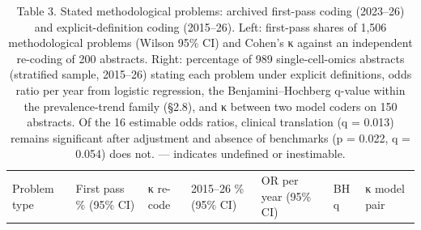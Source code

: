 \documentclass[11pt]{article}
\begin{document}
\begin{scriptsize}

\begin{longtable}[]{@{}
  >{\raggedright\arraybackslash}p{}
  >{\raggedright\arraybackslash}p{}
  >{\raggedright\arraybackslash}p{}
  >{\raggedright\arraybackslash}p{}
  >{\raggedright\arraybackslash}p{}
  >{\raggedright\arraybackslash}p{}
  >{\raggedright\arraybackslash}p{}@{}}
\caption{Table 3. Stated methodological problems: archived first-pass
coding (2023--26) and explicit-definition coding (2015--26). Left:
first-pass shares of 1,506 methodological problems (Wilson 95\% CI) and
Cohen's κ against an independent re-coding of 200 abstracts. Right:
percentage of 989 single-cell-omics abstracts (stratified sample,
2015--26) stating each problem under explicit definitions, odds ratio
per year from logistic regression, the Benjamini--Hochberg q-value
within the prevalence-trend family (§2.8), and κ between two model
coders on 150 abstracts. Of the 16 estimable odds ratios, clinical
translation (q = 0.013) remains significant after adjustment and absence
of benchmarks (p = 0.022, q = 0.054) does not. --- indicates undefined
or inestimable.}\tabularnewline
\toprule\noalign{}
\begin{minipage}[b]{\linewidth}\raggedright
Problem type
\end{minipage} & \begin{minipage}[b]{\linewidth}\raggedright
First pass \% (95\% CI)
\end{minipage} & \begin{minipage}[b]{\linewidth}\raggedright
κ re-code
\end{minipage} & \begin{minipage}[b]{\linewidth}\raggedright
2015--26 \% (95\% CI)
\end{minipage} & \begin{minipage}[b]{\linewidth}\raggedright
OR per year (95\% CI)
\end{minipage} & \begin{minipage}[b]{\linewidth}\raggedright
BH q
\end{minipage} & \begin{minipage}[b]{\linewidth}\raggedright
κ model pair
\end{minipage} \\

\end{longtable}
\end{scriptsize}
\end{document}
